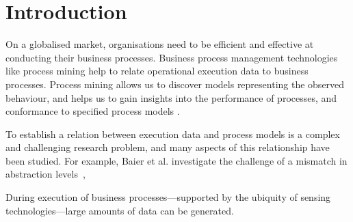 \section{Introduction}
\label{sec:intro}
On a globalised market, organisations need to be efficient and effective at conducting their business processes. Business process management technologies like process mining help to relate operational execution data to business processes. Process mining allows us to discover models representing the observed behaviour, and helps us to gain insights into the performance of processes, and conformance to specified process models \cite{DBLP:books/sp/Aalst16}.

To establish a relation between execution data and process models is a complex and challenging research problem, and many aspects of this relationship have been studied. For example, Baier et al. investigate the challenge of a mismatch in abstraction levels~\cite{DBLP:journals/is/0001MW14},

During execution of business processes---supported by the ubiquity of sensing technologies---large amounts of data can be generated. 
